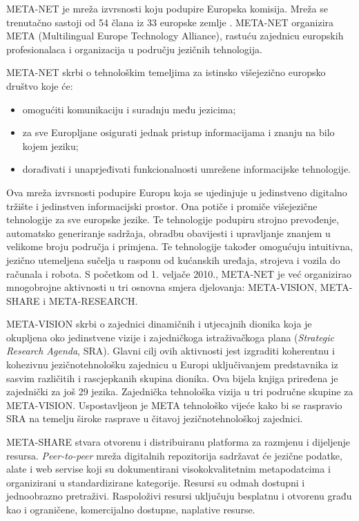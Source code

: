 \begin{multicols}{2}
META-NET je mreža izvrsnosti koju podupire Europska komisija. Mreža se trenutačno sastoji od 54 člana iz 33 europske zemlje \cite{art10}. META-NET organizira META (Multilingual Europe Technology Alliance), rastuću zajednicu europskih profesionalaca i organizacija u području jezičnih tehnologija.

META-NET skrbi o tehnološkim temeljima za istinsko višejezično europsko društvo koje će:
\begin{itemize}
\item omogućiti komunikaciju i suradnju među jezicima;
\item za sve Europljane osigurati jednak pristup informacijama i znanju na bilo kojem jeziku;
\item dorađivati i unaprjeđivati funkcionalnosti umrežene informacijske tehnologije.
\end{itemize}

Ova mreža izvrsnosti podupire Europu koja se ujedinjuje u jedinstveno digitalno tržište i jedinstven informacijski prostor. Ona potiče i promiče višejezične tehnologije za sve europske jezike. Te tehnologije podupiru strojno prevođenje, automatsko generiranje sadržaja, obradbu obavijesti i upravljanje znanjem u velikome broju područja i primjena. Te tehnologije također omogućuju intuitivna, jezično utemeljena sučelja u rasponu od kućanskih uređaja, strojeva i vozila do računala i robota. S početkom od 1. veljače 2010., META-NET je već organizirao mnogobrojne aktivnosti u tri osnovna smjera djelovanja: META-VISION, META-SHARE i META-RESEARCH.

META-VISION skrbi o zajednici dinamičnih i utjecajnih dionika koja je okupljena oko jedinstvene vizije i zajedničkoga istraživačkoga plana (\emph{Strategic Research Agenda}, SRA). Glavni cilj ovih aktivnosti jest izgraditi koherentnu i kohezivnu jezičnotehnološku zajednicu u Europi uključivanjem predstavnika iz sasvim različitih i rascjepkanih skupina dionika. Ova bijela knjiga priređena je zajednički za još 29 jezika. Zajednička tehnološka vizija u tri područne skupine za META-VISION. Uspostavljeon je META tehnološko vijeće kako bi se raspravio SRA na temelju široke rasprave u čitavoj jezičnotehnološkoj zajednici.

META-SHARE stvara otvorenu i distribuiranu platforma za razmjenu i dijeljenje resursa. \emph{Peer-to-peer} mreža digitalnih repozitorija sadržavat će jezične podatke, alate i web servise koji su dokumentirani visokokvalitetnim metapodatcima i organizirani u standardizirane kategorije. Resursi su odmah dostupni i jednoobrazno pretraživi. Raspoloživi resursi uključuju besplatnu i otvorenu građu kao i ograničene, komercijalno dostupne, naplative resurse.


\end{multicols}
